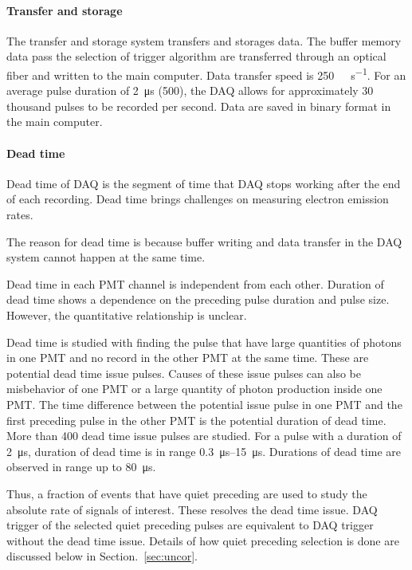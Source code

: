 \paragraph{Transfer and storage} %
The transfer and storage system transfers and storages data. The buffer memory data pass the selection of trigger algorithm are transferred through an optical fiber and written to the main computer. Data transfer speed is \SI{250}{\mega\byte\per\second}. For an average pulse duration of \SI{2}{\us} (\SI{500}{\sample}), the DAQ allows for approximately 30 thousand pulses to be recorded per second. Data are saved in binary format in the main computer.

\paragraph{Dead time} %
Dead time of DAQ is the segment of time that DAQ stops working after the end of each recording. Dead time brings challenges on measuring electron emission rates. 

The reason for dead time is because buffer writing and data transfer in the DAQ system cannot happen at the same time. 

Dead time in each PMT channel is independent from each other. Duration of dead time shows a dependence on the preceding pulse duration and pulse size. However, the quantitative relationship is unclear. 

Dead time is studied with finding the pulse that have large quantities of photons in one PMT and no record in the other PMT at the same time. These are potential dead time issue pulses. Causes of these issue pulses can also be misbehavior of one PMT or a large quantity of photon production inside one PMT. The time difference between the potential issue pulse in one PMT and the first preceding pulse in the other PMT is the potential duration of dead time. 
More than \num{400} dead time issue pulses are studied. For a pulse with a duration of \SI{2}{\us}, duration of dead time is in range \SIrange{0.3}{15}{\us}. Durations of dead time are observed in range up to \SI{80}{\us}.

Thus, a fraction of events that have quiet preceding are used to study the absolute rate of signals of interest. These resolves the dead time issue. DAQ trigger of the selected quiet preceding pulses are equivalent to DAQ trigger without the dead time issue. Details of how quiet preceding selection is done are discussed below in Section.~\ref{sec:uncor}.

